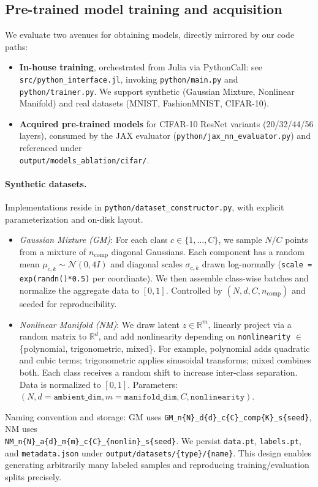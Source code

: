\documentclass[11pt]{article}
\begin{document}
\subsection{Pre-trained model training and acquisition}
We evaluate two avenues for obtaining models, directly mirrored by our code paths:
\begin{itemize}[leftmargin=1.5em]
  \item \textbf{In-house training}, orchestrated from Julia via PythonCall: see \texttt{src/python\_interface.jl}, invoking \texttt{python/main.py} and \texttt{python/trainer.py}. We support synthetic (Gaussian Mixture, Nonlinear Manifold) and real datasets (MNIST, FashionMNIST, CIFAR-10).
  \item \textbf{Acquired pre-trained models} for CIFAR-10 ResNet variants (20/32/44/56 layers), consumed by the JAX evaluator (\texttt{python/jax\_nn\_evaluator.py}) and referenced under 
  \\\texttt{output/models\_ablation/cifar/}.
\end{itemize}

\paragraph{Synthetic datasets.} Implementations reside in \texttt{python/dataset\_constructor.py}, with explicit parameterization and on-disk layout.
\begin{itemize}[leftmargin=1.5em]
  \item \emph{Gaussian Mixture (GM)}: For each class $c \in \{1,\dots,C\}$, we sample $N/C$ points from a mixture of $n_{\text{comp}}$ diagonal Gaussians. Each component has a random mean $\mu_{c,k} \sim \mathcal{N}(0,4I)$ and diagonal scales $\sigma_{c,k}$ drawn log-normally (\texttt{scale = exp(randn()*0.5)} per coordinate). We then assemble class-wise batches and normalize the aggregate data to $[0,1]$. Controlled by $(N, d, C, n_{\text{comp}})$ and seeded for reproducibility.
  \item \emph{Nonlinear Manifold (NM)}: We draw latent $z \in \mathbb{R}^{m}$, linearly project via a random matrix to $\mathbb{R}^{d}$, and add nonlinearity depending on \texttt{nonlinearity} $\in$ \{polynomial, trigonometric, mixed\}. For example, polynomial adds quadratic and cubic terms; trigonometric applies sinusoidal transforms; mixed combines both. Each class receives a random shift to increase inter-class separation. Data is normalized to $[0,1]$. Parameters: $(N, d\!=\!\texttt{ambient\_dim}, m\!=\!\texttt{manifold\_dim}, C, \texttt{nonlinearity})$.
\end{itemize}
Naming convention and storage: GM uses \texttt{GM\_n\{N\}\_d\{d\}\_c\{C\}\_comp\{K\}\_s\{seed\}}, NM uses \\\texttt{NM\_n\{N\}\_a\{d\}\_m\{m\}\_c\{C\}\_\{nonlin\}\_s\{seed\}}. We persist \texttt{data.pt}, \texttt{labels.pt}, and \texttt{metadata.json} under \texttt{output/datasets/\{type\}/\{name\}}. This design enables generating arbitrarily many labeled samples and reproducing training/evaluation splits precisely.
\end{document}
